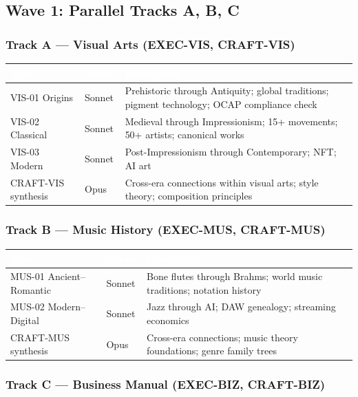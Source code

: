 \documentclass[11pt,letterpaper]{article}
\newcommand{\tableheader}[1]{\textbf{\sffamily\textcolor{white}{#1}}}
\begin{document}
\subsection{Wave 1: Parallel Tracks A, B, C}

\subsubsection*{Track A --- Visual Arts (EXEC-VIS, CRAFT-VIS)}

\begin{tabularx}{\textwidth}{L{2.5cm}L{2cm}X}
\toprule
{}
\tableheader{Task} & \tableheader{Model} & \tableheader{Description} \\
\midrule
VIS-01 Origins & Sonnet & Prehistoric through Antiquity; global traditions; pigment technology; OCAP compliance check \\
VIS-02 Classical & Sonnet & Medieval through Impressionism; 15+ movements; 50+ artists; canonical works \\
VIS-03 Modern & Sonnet & Post-Impressionism through Contemporary; NFT; AI art \\
CRAFT-VIS synthesis & Opus & Cross-era connections within visual arts; style theory; composition principles \\
\bottomrule
\end{tabularx}

\subsubsection*{Track B --- Music History (EXEC-MUS, CRAFT-MUS)}

\begin{tabularx}{\textwidth}{L{2.5cm}L{2cm}X}
\toprule
{}
\tableheader{Task} & \tableheader{Model} & \tableheader{Description} \\
\midrule
MUS-01 Ancient--Romantic & Sonnet & Bone flutes through Brahms; world music traditions; notation history \\
MUS-02 Modern--Digital & Sonnet & Jazz through AI; DAW genealogy; streaming economics \\
CRAFT-MUS synthesis & Opus & Cross-era connections; music theory foundations; genre family trees \\
\bottomrule
\end{tabularx}

\subsubsection*{Track C --- Business Manual (EXEC-BIZ, CRAFT-BIZ)}
\end{document}
